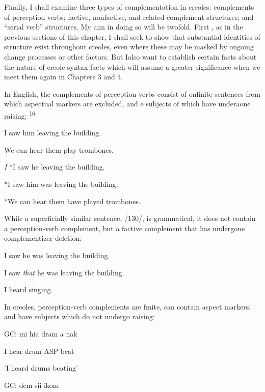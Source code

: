 Finally, I shall examine three types of complementation in creoles: complements of perception verbs; factive, nonfactive, and related complement structures; and ``serial verb'' structures. My aim in doing so will be twofold. First , as in the previous sections of this chapter, I shall seek to show that substantial identities of structure exist throughout creoles, even where these may be masked by ongoing change processes or other factors. But Ialso want to establish certain facts about the nature of creole syntax-facts which will assume a greater significance when we meet them again in Chapters 3 and 4.

In English, the complements of perception verbs consist of onfinite sentences from which aspectual markers are excluded, and e subjects of which have underaone raising: \textsuperscript{1}\textsuperscript{6}

\ea\label{ex:125}
 I saw him leaving the building.
\glt
\z

\ea\label{ex:126}
We can hear them play trombones.
\glt
\z

\ea\label{ex:127}
 \textit{I} *I saw he leaving the building.
\glt
\z

\ea\label{ex:128}
 *I saw him was leaving the building.
\glt
\z

\ea\label{ex:129}
 *We can hear them have played trombones.
\glt
\z

While a superficially similar sentence, /130/, is grammatical, it does not contain a perception-verb complement, but a factive complement that has undergone complementizer deletion:

  


 


\ea\label{ex:130}
 I saw he was leaving the building.
\glt
\z

\ea\label{ex:131}
 I saw \textit{that} he was leaving the building.
\glt
\z

\ea\label{ex:137}
 I heard singing.
\glt
\z



In creoles, perception-verb complements are fmite, can contain aspect markers, and have subjects which do not undergo raising:

\ea\label{ex:132}
 GC: mi hia dram a nak
\glt
\z

I hear drum ASP beat

'I heard drums beating'

\ea\label{ex:133}
 GC: dem sii ikom
\glt
\z

